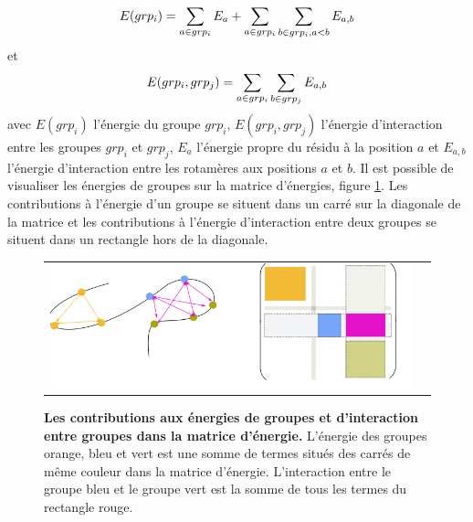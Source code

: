 \begin{equation}
E(grp_i) = \sum_{a \in grp_i}E_a + \sum_{a\in grp_i} \sum_{b\in grp_i, a < b}E_{a,b} \\
\end{equation}
et
\begin{equation}
E(grp_i,grp_j) = \sum_{a \in grp_i} \sum_{b \in grp_j} E_{a,b} \\
\end{equation}
avec $E(grp_i)$ l'énergie du groupe $grp_i$, $E(grp_i,grp_j)$ l'énergie d'interaction entre les groupes $grp_i$ et $grp_j$, $E_a$ l'énergie propre du résidu à la position $a$ et $E_{a,b}$ l'énergie d'interaction entre les rotamères aux positions $a$ et $b$. Il est possible de visualiser les énergies de groupes sur la matrice d'énergies, figure \ref{fig:matrix_grp}. Les contributions à l'énergie d'un groupe se situent dans un carré sur la diagonale de la matrice et les contributions à l'énergie d'interaction entre deux groupes se situent dans un rectangle hors de la diagonale.


   \begin{figure}[!htbp]
     \centering
     \begin{tabular}{cc}
       \includegraphics[width=12cm]{figure/grp_matrix.png} &
     \end{tabular}
     
     \caption{\textbf{Les contributions aux énergies de groupes et d'interaction entre groupes dans la matrice d'énergie.} L'énergie des groupes orange, bleu et vert est une somme de termes situés des carrés de même couleur dans la matrice d'énergie. L'interaction entre le groupe bleu et le groupe vert est la somme de tous les termes du rectangle rouge.}
\label{fig:matrix_grp}
   \end{figure}
   

